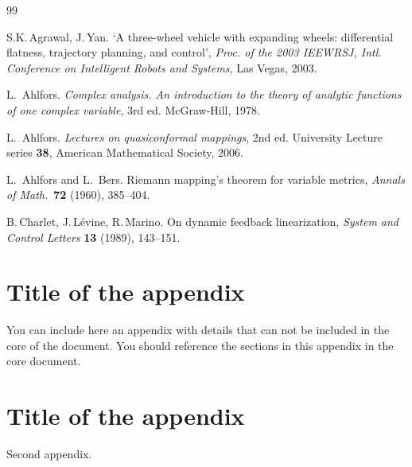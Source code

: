 \documentclass[12,twoside]{MESIOTFM}
\theoremstyle{definition}
\theoremstyle{remark}
\begin{document}
\begin{thebibliography}{99}

 S.K.\,Agrawal, J.\,Yan. `A three-wheel vehicle with
    expanding wheels: differential flatness, trajectory planning, and control',
    \textit{Proc. of the 2003 IEEWRSJ, Intl. Conference on Intelligent Robots and
    Systems}, Las Vegas, 2003.

 L.~Ahlfors. {\em Complex analysis. An introduction to the theory of analytic functions of one complex variable}, 3rd ed. McGraw-Hill, 1978.

 L.~Ahlfors. {\em Lectures on quasiconformal mappings}, 2nd ed.
University Lecture series {\bf 38}, American Mathematical Society, 2006.

 L.~Ahlfors and L.~Bers.
  Riemann mapping's theorem for variable metrics,
{\em Annals of Math.}~{\bf 72} (1960), 385--404.
    
 B.\,Charlet, J.\,L\'evine, R.\,Marino. On dynamic feedback
    linearization, {\em System and Control Letters} \textbf{13} (1989), 143--151.

\end{thebibliography}

\appendix
\vfill\newpage \section{Title of the appendix}
You can include here an appendix with details that can not be included in the core of the document. You should reference the sections in this appendix in the core document.
\vfill\newpage \section{Title of the appendix}
Second appendix.
\end{document}
